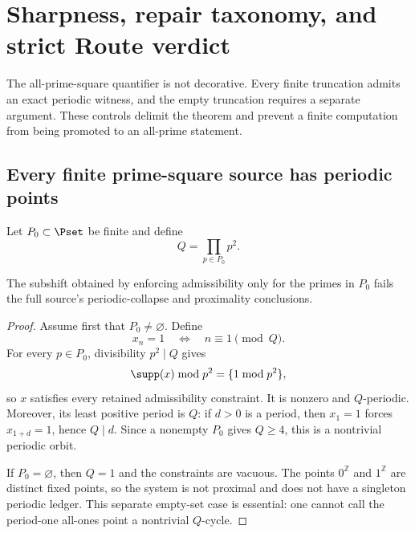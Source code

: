\section{Sharpness, repair taxonomy, and strict Route verdict}
\label{sec:sharpness-route}

The all-prime-square quantifier is not decorative.  Every finite truncation
admits an exact periodic witness, and the empty truncation requires a separate
argument.  These controls delimit the theorem and prevent a finite
computation from being promoted to an all-prime statement.

\subsection{Every finite prime-square source has periodic points}

Let \(P_0\subset\Pset\) be finite and define
\begin{equation}
  Q=\prod_{p\in P_0}p^2.
  \label{eq:finite-Q}
\end{equation}

\begin{proposition}
\label{prop:finite-sharpness}
The subshift obtained by enforcing admissibility only for the primes in
\(P_0\) fails the full source's periodic-collapse and proximality
conclusions.
\end{proposition}

\begin{proof}
Assume first that \(P_0\neq\varnothing\).  Define
\begin{equation}
  x_n=1
  \quad\Longleftrightarrow\quad
  n\equiv1\pmod Q.
  \label{eq:finite-witness}
\end{equation}
For every \(p\in P_0\), divisibility \(p^2\mid Q\) gives
\[
  \supp(x)\bmod p^2=\{1\bmod p^2\},
\]
so \(x\) satisfies every retained admissibility constraint.  It is nonzero
and \(Q\)-periodic.  Moreover, its least positive period is \(Q\): if
\(d>0\) is a period, then \(x_1=1\) forces \(x_{1+d}=1\), hence
\(Q\mid d\).  Since a nonempty \(P_0\) gives \(Q\geq4\), this is a
nontrivial periodic orbit.

If \(P_0=\varnothing\), then \(Q=1\) and the constraints are vacuous.
The points \(0^{\mathbb Z}\) and \(1^{\mathbb Z}\) are distinct fixed
points, so the system is not proximal and does not have a singleton periodic
ledger.  This separate empty-set case is essential: one cannot call the
period-one all-ones point a nontrivial \(Q\)-cycle.
\end{proof}

